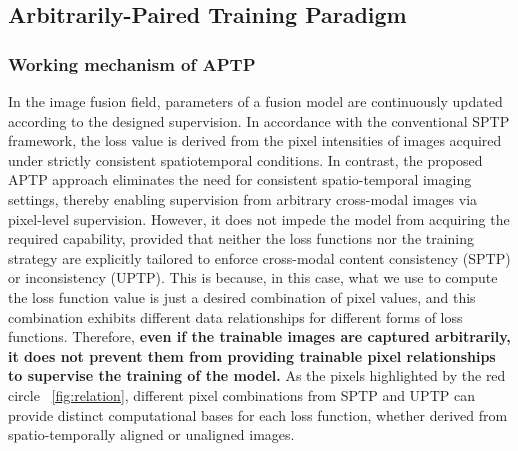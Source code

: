 \subsection{Arbitrarily-Paired Training Paradigm}
\label{sec:essence}
 
\subsubsection{Working mechanism of APTP}
In the image fusion field, parameters of a fusion model are continuously updated according to the designed supervision.  
In accordance with the conventional SPTP framework, the loss value is derived from the pixel intensities of images acquired under strictly consistent spatiotemporal conditions.
In contrast, the proposed APTP approach eliminates the need for consistent spatio-temporal imaging settings, thereby enabling supervision from arbitrary cross-modal images via pixel-level supervision. 
However, it does not impede the model from acquiring the required capability, provided that neither the loss functions nor the training strategy are explicitly tailored to enforce cross-modal content consistency (SPTP) or inconsistency (UPTP). 
This is because, in this case, what we use to compute the loss function value is just a desired combination of pixel values, and this combination exhibits different data relationships for different forms of loss functions. 
Therefore, \textbf{even if the trainable images are captured arbitrarily, it does not prevent them from providing trainable pixel relationships to supervise the training of the model.}
As the pixels highlighted by the red circle ~\cref{fig:relation}, different pixel combinations from SPTP and UPTP can provide distinct computational bases for each loss function, whether derived from spatio-temporally aligned or unaligned images. 

